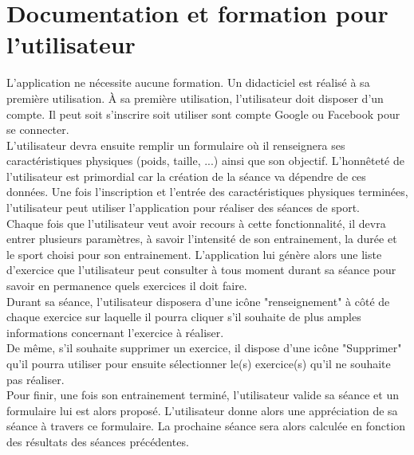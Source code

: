 \section{Documentation et formation pour l'utilisateur}

L'application ne nécessite aucune formation. Un didacticiel est réalisé à sa première utilisation. À sa première utilisation, l'utilisateur doit disposer d'un compte. Il peut soit s'inscrire soit utiliser sont compte Google ou Facebook pour se connecter.\\

L'utilisateur devra ensuite remplir un formulaire où il renseignera ses caractéristiques physiques (poids, taille, ...) ainsi que son objectif. L'honnêteté de l'utilisateur est primordial car la création de la séance va dépendre de ces données. Une fois l'inscription et l'entrée des caractéristiques physiques terminées, l'utilisateur peut utiliser l'application pour réaliser des séances de sport.\\

Chaque fois que l'utilisateur veut avoir recours à cette fonctionnalité, il devra entrer plusieurs paramètres, à savoir l'intensité de son entrainement, la durée et le sport choisi pour son entrainement. L'application lui génère alors une liste d'exercice que l'utilisateur peut  consulter à tous moment durant sa séance pour savoir en permanence quels exercices il doit faire.\\

Durant sa séance, l'utilisateur disposera d'une icône "renseignement" à côté de chaque exercice sur laquelle il pourra cliquer s'il souhaite de plus amples informations concernant l'exercice à réaliser.\\

De même, s'il souhaite supprimer un exercice, il dispose d'une icône "Supprimer" qu'il pourra utiliser pour ensuite sélectionner le(s) exercice(s) qu'il ne souhaite pas réaliser.\\

Pour finir, une fois son entrainement terminé, l'utilisateur valide sa séance et un formulaire lui est alors proposé. L'utilisateur donne alors une appréciation de sa séance à travers ce formulaire. La prochaine séance sera alors calculée en fonction des résultats des séances précédentes.

